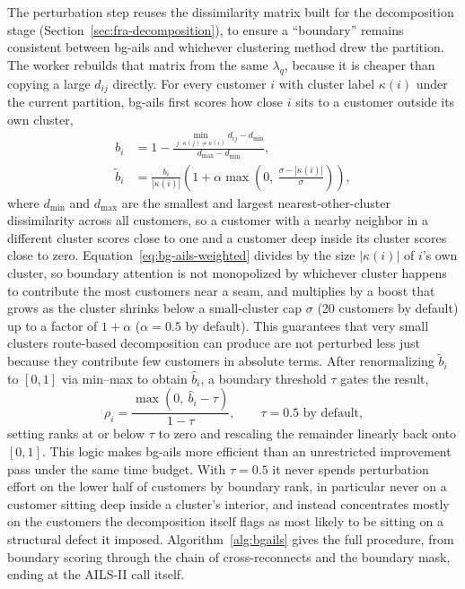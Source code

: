 The perturbation step reuses the dissimilarity matrix built for the decomposition stage (Section~\ref{sec:fra-decomposition}), to ensure a ``boundary'' remains consistent between \gls{bg-ails} and whichever clustering method drew the partition. The worker rebuilds that matrix from the same $\lambda_q$, because it is cheaper than copying a large $d_{ij}$ directly. For every customer $i$ with cluster label $\kappa(i)$ under the current partition, \gls{bg-ails} first scores how close $i$ sits to a customer outside its own cluster,
\begin{align}
b_i &= 1 - \frac{\min_{j:\ \kappa(j) \neq \kappa(i)} d_{ij} - d_{\min}}{d_{\max} - d_{\min}}, \label{eq:bg-ails-boundary}\\
\tilde b_i &= \frac{b_i}{|\kappa(i)|}\left(1 + \alpha \max\!\left(0,\ \frac{\sigma - |\kappa(i)|}{\sigma}\right)\right), \label{eq:bg-ails-weighted}
\end{align}
where $d_{\min}$ and $d_{\max}$ are the smallest and largest nearest-other-cluster dissimilarity across all customers, so a customer with a nearby neighbor in a different cluster scores close to one and a customer deep inside its cluster scores close to zero. Equation~\ref{eq:bg-ails-weighted} divides by the size $|\kappa(i)|$ of $i$'s own cluster, so boundary attention is not monopolized by whichever cluster happens to contribute the most customers near a seam, and multiplies by a boost that grows as the cluster shrinks below a small-cluster cap $\sigma$ (20 customers by default) up to a factor of $1 + \alpha$ ($\alpha = 0.5$ by default). This guarantees that very small clusters route-based decomposition can produce are not perturbed less just because they contribute few customers in absolute terms. After renormalizing $\tilde b_i$ to $[0, 1]$ via min--max to obtain $\hat b_i$, a boundary threshold $\tau$ gates the result,
\begin{equation}
\rho_i = \frac{\max(0,\ \hat b_i - \tau)}{1 - \tau}, \qquad \tau = 0.5 \text{ by default,}
\label{eq:bg-ails-threshold}
\end{equation}
setting ranks at or below $\tau$ to zero and rescaling the remainder linearly back onto $[0, 1]$. This logic makes \gls{bg-ails} more efficient than an unrestricted improvement pass under the same time budget. With $\tau = 0.5$ it never spends perturbation effort on the lower half of customers by boundary rank, in particular never on a customer sitting deep inside a cluster's interior, and instead concentrates mostly on the customers the decomposition itself flags as most likely to be sitting on a structural defect it imposed. Algorithm~\ref{alg:bgails} gives the full procedure, from boundary scoring through the chain of cross-reconnects and the boundary mask, ending at the AILS-II call itself.


